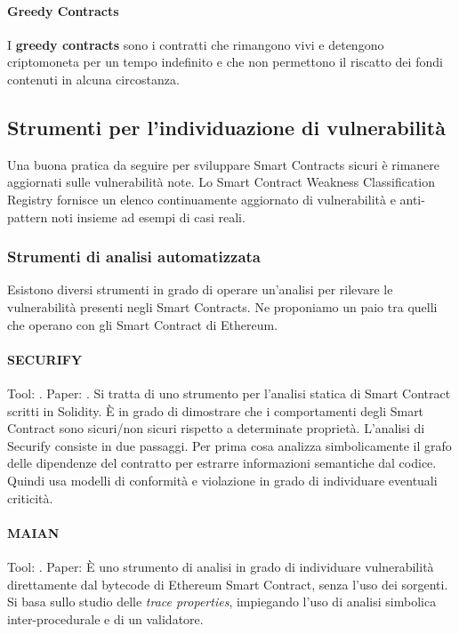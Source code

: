 \paragraph{Greedy Contracts}
I \textbf{greedy contracts} sono i contratti che rimangono vivi e detengono
criptomoneta per un tempo indefinito e che non permettono il riscatto dei
fondi contenuti in alcuna circostanza.

\subsection{Strumenti per l'individuazione di vulnerabilità}
Una buona pratica da seguire per sviluppare Smart Contracts sicuri è
rimanere aggiornati sulle vulnerabilità note.
Lo Smart Contract Weakness Classification Registry \cite{swc-registry} fornisce un elenco
continuamente aggiornato di vulnerabilità e anti-pattern noti insieme ad esempi
di casi reali.

\subsubsection{Strumenti di analisi automatizzata}
Esistono diversi strumenti in grado di operare un'analisi per
rilevare le vulnerabilità presenti
negli Smart Contracts. Ne proponiamo un paio tra quelli che operano con
gli Smart Contract di Ethereum.

\paragraph{SECURIFY} Tool: \cite{secufiry-url}. Paper: \cite{secufiry-paper}.
Si tratta di uno strumento per l'analisi statica di Smart Contract scritti in Solidity. È in grado
di dimostrare che i comportamenti degli Smart Contract sono sicuri/non sicuri
rispetto a determinate proprietà.
L'analisi di Securify consiste in due passaggi.
Per prima cosa analizza simbolicamente il grafo delle dipendenze
del contratto per estrarre informazioni semantiche dal codice.
Quindi usa modelli di conformità e violazione
in grado di individuare eventuali criticità.

\paragraph{MAIAN} Tool: \cite{maian-url}. Paper: \cite{Nikolic2018FindingTG}
È uno strumento di analisi in grado di individuare vulnerabilità direttamente
dal bytecode di Ethereum Smart Contract, senza l'uso dei sorgenti.
Si basa sullo studio delle \textit{trace properties}, impiegando l'uso di
analisi simbolica inter-procedurale e di un validatore.


